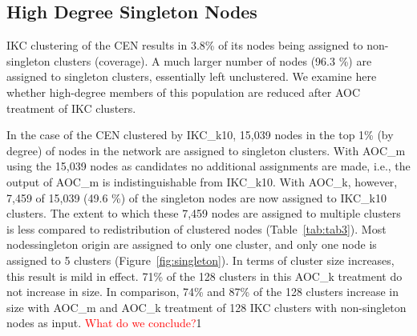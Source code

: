 \documentclass[12pt, oneside]{article}   	%
\begin{document}
\subsection{High Degree Singleton Nodes} 
 
IKC clustering of the CEN results in 3.8\% of its nodes being assigned to non-singleton clusters (coverage). A much larger number of nodes (96.3 \%) are assigned to singleton clusters, essentially left unclustered. We examine here whether high-degree members of this population are reduced after AOC treatment of IKC clusters. 

In the case of the CEN clustered by IKC\_k10, 15,039 nodes in the top 1\% (by degree) of nodes in the network are assigned to singleton clusters.  With AOC\_m using the 15,039 nodes as candidates no additional assignments are made, i.e., the output of AOC\_m is indistinguishable from IKC\_k10. With AOC\_k, however, 7,459 of 15,039 (49.6 \%) of the singleton nodes are now assigned to IKC\_k10 clusters. The extent to which these 7,459 nodes are assigned to multiple clusters is less compared to redistribution of clustered nodes (Table~\ref{tab:tab3}). Most nodessingleton origin are assigned to only one cluster, and only one node is assigned to 5 clusters (Figure~\ref{fig:singleton}). In terms of cluster size increases, this result is mild in effect. 71\% of the 128 clusters in this AOC\_k treatment do not increase in size. In comparison, 74\% and 87\% of the 128 clusters increase in size with AOC\_m and AOC\_k treatment of 128 IKC clusters with non-singleton nodes as input.  \textcolor{red}{What do we conclude?}1
\end{document}
